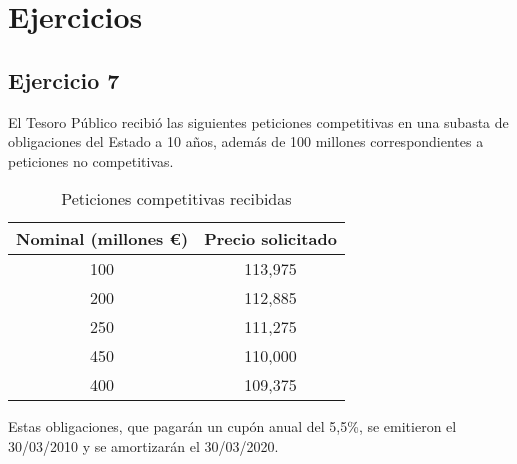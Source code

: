 \section{Ejercicios}

\subsection*{Ejercicio 7 }

El Tesoro Público recibió las siguientes peticiones competitivas en una subasta de obligaciones del Estado a 10 años, además de 100 millones correspondientes a peticiones no competitivas.

\begin{table}[H]
\centering
\begin{tabular}{|c|c|}
\hline
Nominal (millones €) & Precio solicitado \\ \hline
100                  & 113,975           \\ \hline
200                  & 112,885           \\ \hline
250                  & 111,275           \\ \hline
450                  & 110,000           \\ \hline
400                  & 109,375           \\ \hline
\end{tabular}
\caption{Peticiones competitivas recibidas}
\end{table}

Estas obligaciones, que pagarán un cupón anual del 5,5\%, se emitieron el 30/03/2010 y se amortizarán el 30/03/2020.

